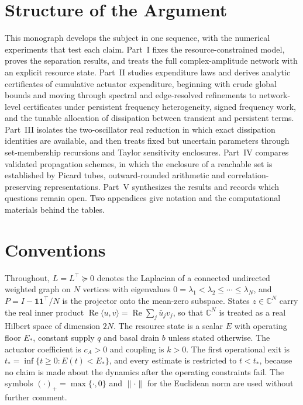 \documentclass[11pt,notitlepage]{report}
\theoremstyle{definition}
\theoremstyle{remark}
\newcommand{\C}{\mathbb C}
\newcommand{\re}{\operatorname{Re}}
\newcommand{\one}{\mathbf 1}
\begin{document}
\section{Structure of the Argument}
This monograph develops the subject in one sequence, with the numerical experiments that test each claim. Part~I fixes the resource-constrained model, proves the separation results, and treats the full complex-amplitude network with an explicit resource state. Part~II studies expenditure laws and derives analytic certificates of cumulative actuator expenditure, beginning with crude global bounds and moving through spectral and edge-resolved refinements to network-level certificates under persistent frequency heterogeneity, signed frequency work, and the tunable allocation of dissipation between transient and persistent terms. Part~III isolates the two-oscillator real reduction in which exact dissipation identities are available, and then treats fixed but uncertain parameters through set-membership recursions and Taylor sensitivity enclosures. Part~IV compares validated propagation schemes, in which the enclosure of a reachable set is established by Picard tubes, outward-rounded arithmetic and correlation-preserving representations. Part~V synthesizes the results and records which questions remain open. Two appendices give notation and the computational materials behind the tables.

\section{Conventions}
Throughout, $L=L^\top\succeq0$ denotes the Laplacian of a connected undirected weighted graph on $N$ vertices with eigenvalues $0=\lambda_1<\lambda_2\le\cdots\le\lambda_N$, and $P=I-\one\one^\top/N$ is the projector onto the mean-zero subspace. States $z\in\C^N$ carry the real inner product $\re\langle u,v\rangle=\re\sum_j\bar u_jv_j$, so that $\C^N$ is treated as a real Hilbert space of dimension $2N$. The resource state is a scalar $E$ with operating floor $E_*$, constant supply $q$ and basal drain $b$ unless stated otherwise. The actuator coefficient is $c_A>0$ and coupling is $k>0$. The first operational exit is $t_*=\inf\{t\ge0:E(t)<E_*\}$, and every estimate is restricted to $t<t_*$, because no claim is made about the dynamics after the operating constraints fail. The symbols $(\cdot)_+=\max\{\cdot,0\}$ and $\|\cdot\|$ for the Euclidean norm are used without further comment.
\end{document}
